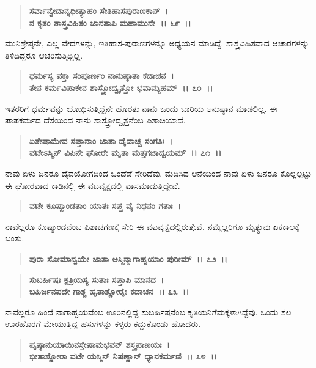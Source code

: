 \begin{verse}
\textbf{ಸರ್ವಾನ್ವೇದಾನ್ನಧೀತ್ಯಾಹಂ ಸೇತಿಹಾಸಪುರಾಣಕಾನ್~।}\\\textbf{ನ ಕೃತಂ ಶಾಸ್ತ್ರವಿಹಿತಂ ಜಾನತಾಪಿ ಮಹಾಮುನೇ~।। ೬೯~।।}
\end{verse}

ಮುನಿಶ್ರೇಷ್ಠನೇ, ಎಲ್ಲ ವೇದಗಳನ್ನು, ಇತಿಹಾಸ-ಪುರಾಣಗಳನ್ನೂ ಅಧ್ಯಯನ ಮಾಡಿದ್ದೆ. ಶಾಸ್ತ್ರವಿಹಿತವಾದ ಆಚಾರಗಳನ್ನು ತಿಳಿದಿದ್ದರೂ ಆಚರಿಸುತ್ತಿದ್ದಿಲ್ಲ.

\begin{verse}
\textbf{ಧರ್ಮಸ್ಯ ವಕ್ತಾ ಸಂಪೂರ್ಣಂ ನಾನುಷ್ಠಾತಾ ಕದಾಚನ~।}\\\textbf{ತೇನ ಕರ್ಮವಿಪಾಕೇನ ಶಾಸ್ತ್ರೋದ್ವೃತ್ತೋ ಭವಾಮ್ಯಹಮ್~।। ೭೦~।।}
\end{verse}

ಇತರರಿಗೆ ಧರ್ಮವನ್ನು ಬೋಧಿಸುತ್ತಿದ್ದೆನೇ ಹೊರತು ನಾನು ಒಂದು ಬಾರಿಯ ಅನುಷ್ಠಾನ ಮಾಡಲಿಲ್ಲ. ಈ ಪಾಪಕರ್ಮದ ದೆಸೆಯಿಂದ ನಾನು ಶಾಸ್ತ್ರೋದ್ವೃತ್ತನೆಂಬ ಪಿಶಾಚಿಯಾದೆ.

\begin{verse}
\textbf{ಏತೇಷಾಮೇವ ಸಪ್ತಾನಾಂ ಜಾತಾ ದೈವಾಚ್ಚ ಸಂಗತಿಃ~।}\\\textbf{ವಟೇಽಸ್ಮಿನ್ ವಿಪಿನೇ ಘೋರೇ ಮೃತಾ ಮತ್ತಗಜಾದ್ವಯಮ್~।। ೭೧~।।}
\end{verse}

ನಾವು ಏಳು ಜನರೂ ದೈವಯೋಗದಿಂದ ಒಂದೆಡೆ ಸೇರಿದೆವು. ಮದಿಸಿದ ಆನೆಯಿಂದ ನಾವು ಏಳು ಜನರೂ ಕೊಲ್ಲಲ್ಪಟ್ಟು ಈ ಘೋರವಾದ ಕಾಡಿನಲ್ಲಿ ಈ ವಟವೃಕ್ಷದಲ್ಲಿ ವಾಸಮಾಡುತ್ತಿದ್ದೇವೆ.

\begin{verse}
\textbf{ವಟೇ ಕೂಷ್ಮಾಂಡತಾಂ ಯಾತಃ ಸಪ್ತ ವೈ ನಿಧನಂ ಗತಾಃ~।}
\end{verse}

ನಾವೆಲ್ಲರೂ ಕೂಷ್ಮಾಂಡವೆಂಬ ಪಿಶಾಚಗಣಕ್ಕೆ ಸೇರಿ ಈ ವಟವೃಕ್ಷದಲ್ಲಿರುತ್ತೇವೆ. ನಮ್ಮೆಲ್ಲರಿಗೂ ಮೃತ್ಯುವು ಏಕಕಾಲಕ್ಕೆ ಬಂತು.

\begin{verse}
\textbf{ಪುರಾ ಸೋಮಾನ್ವಯೇ ಜಾತಾ ಅಸ್ಮಿನ್ಮಾಗಾಹ್ವಯಾಂ ಪುರೀಮ್~।। ೭೨~।।} 
\end{verse}

\begin{verse}
\textbf{ಸುಬರ್ಹಿಷಃ ಕ್ಷತ್ರಿಯಸ್ಯ ಸುತಾಃ ಸಪ್ತಾಪಿ ಮಾನದ~।}\\\textbf{ಬಹಿರ್ಜನಪದೇ ಗಾಶ್ಚ ಹೃತಾಶ್ಣೋರೈಃ ಕದಾಚನ~।। ೭೩~।।}
\end{verse}

ನಾವೆಲ್ಲರೂ ಹಿಂದೆ ನಾಗಾಹ್ವಯವೆಂಬ ಊರಿನಲ್ಲಿದ್ದ ಸುಬರ್ಹಿಷನೆಂಬ ಕೃತಿಯನಿಗೆ\break ಮಕ್ಕಳಾಗಿದ್ದೆವು. ಒಂದು ಸಲ ಊರಹೊರಗೆ ಮೇಯುತ್ತಿದ್ದ ಹಸುಗಳನ್ನು ಕಳ್ಳರು ಕದ್ದುಕೊಂಡು ಹೋದರು.

\begin{verse}
\textbf{ಪೃಷ್ಠಾನುಯಾಯಿನಸ್ತೇಷಾಮಭವನ್ ಶಸ್ತ್ರಪಾಣಯಃ~।}\\\textbf{ಭೀತಾಶ್ಣೋರಾ ವಟೇ ಯಸ್ಮಿನ್ ನಿಷಣ್ಣಾನ್ ಧ್ಯಾನಕರ್ಮಣಿ~।। ೭೪~।।}
\end{verse}

